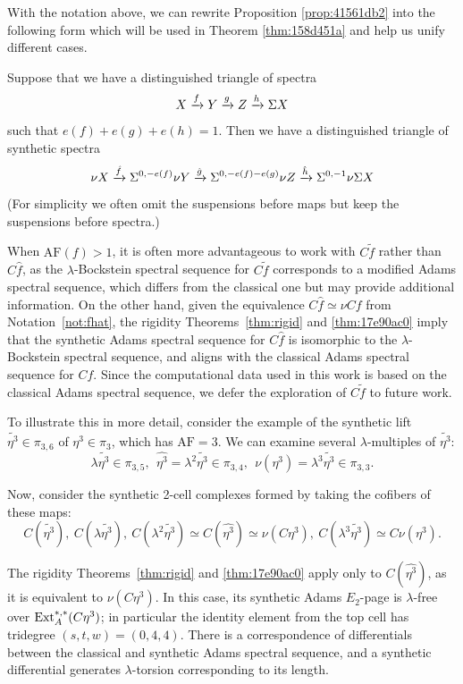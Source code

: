 \documentclass{amsart}
\numberwithin{equation}{section}
\newcommand{\AF}{\mathrm{AF}}
\begin{document}
With the notation above, we can rewrite Proposition \ref{prop:41561db2} into the following form which will be used in Theorem \ref{thm:158d451a} and help us unify different cases.

\begin{proposition}
    Suppose that we have a distinguished triangle of spectra
    $$X\xrightarrow{f} Y\xrightarrow{g} Z\xrightarrow{h} \Sigma X$$
    such that $e(f)+e(g)+e(h)=1$. Then we have a distinguished triangle of synthetic spectra
    $$\nu X\xrightarrow{\hat f} \Sigma^{0,-e(f)}\nu Y\xrightarrow{\hat g} \Sigma^{0,-e(f)-e(g)}\nu Z\xrightarrow{\hat h} \Sigma^{0,-1}\nu \Sigma X$$
    (For simplicity we often omit the suspensions before maps but keep the suspensions before spectra.)
\end{proposition}

\begin{remark}
    When $\AF(f)>1$, it is often more advantageous to work with $C\tilde f$ rather than $C\hat f$, as the $\lambda$-Bockstein spectral sequence for $C\tilde f$ corresponds to a modified Adams spectral sequence, which differs from the classical one but may provide additional information. On the other hand, given the equivalence  $C\hat{f}\simeq \nu Cf$ from Notation~\ref{not:fhat}, the rigidity Theorems~\ref{thm:rigid} and \ref{thm:17e90ac0} imply that the synthetic Adams spectral sequence for $C\hat f$ is isomorphic to the $\lambda$-Bockstein spectral sequence, and aligns with the classical Adams spectral sequence for $Cf$.  Since the computational data used in this work is based on the classical Adams spectral sequence, we defer the exploration of $C\tilde f$ to future work.
    
    To illustrate this in more detail, consider the example of the synthetic lift $\tilde{\eta^3} \in \pi_{3,6}$ of $\eta^3 \in \pi_3$, which has $\AF = 3$. We can examine several $\lambda$-multiples of $\tilde{\eta^3}$:
    $$\lambda \tilde{\eta^3} \in \pi_{3,5}, \ \ \hat{\eta^3} = \lambda^2 \tilde{\eta^3} \in \pi_{3,4}, \ \ \nu(\eta^3) = \lambda^3 \tilde{\eta^3} \in \pi_{3,3}.$$

   Now, consider the synthetic 2-cell complexes formed by taking the cofibers of these maps:
    $$C(\tilde{\eta^3}), \ C(\lambda\tilde{\eta^3}), \ C(\lambda^2\tilde{\eta^3}) \simeq C(\hat{\eta^3}) \simeq \nu (C\eta^3), \ C(\lambda^3\tilde{\eta^3}) \simeq C\nu(\eta^3).$$

    The rigidity Theorems~\ref{thm:rigid} and \ref{thm:17e90ac0} apply only to $C(\hat{\eta^3})$, as it is equivalent to $\nu (C\eta^3)$. In this case, its synthetic Adams $E_2$-page is $\lambda$-free over $\mathrm{Ext}_A^{*,*}(C\eta^3)$; in particular the identity element from the top cell has tridegree $(s,t,w) = (0,4,4)$. There is a correspondence of differentials between the classical and synthetic Adams spectral sequence, and a synthetic differential generates $\lambda$-torsion corresponding to its length.


\end{remark}
\end{document}
